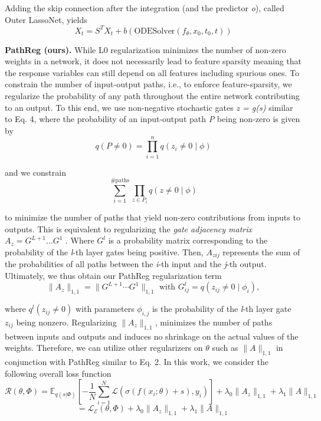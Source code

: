 \documentclass{article}
\begin{document}
    Adding the skip connection after the integration (and the predictor \textit{o}), called Outer LassoNet, yields
    \[
    X_t = S^T X_t + b(\text{ODESolver}(f_{\theta}, x_0, t_0, t)) \tag{8}
    \]

   \textbf{ PathReg (ours).} While L0 regularization minimizes the number of non-zero weights in a network, it
    does not necessarily lead to feature sparsity meaning that the response variables can still depend on
    all features including spurious ones. To constrain the number of input-output paths, i.e., to enforce
    feature-sparsity, we regularize the probability of any path throughout the entire network contributing
    to an output. To this end, we use non-negative stochastic gates \textit{z = g(s)} similar to Eq. 4, where the
    probability of an input-output path \textit{P} being non-zero is given by
    \[
    q(\textit{P} \neq 0) = \prod_{i=1}^{n} q(z_i \neq 0 \mid \phi) \tag{9}
   \]

    and we constrain
    \[
\sum_{i=1}^{\#\text{paths}} \prod_{z \in P_i} q(z \neq 0 \mid \phi) \tag{10} 
\]

    to minimize the number of paths that yield non-zero contributions from inputs to outputs. This is
    equivalent to regularizing the \textit{gate adjacency matrix} $A_{z} = G^{L+1}...G^{1}$
    . Where $G^{l}$
    is a probability
    matrix corresponding to the probability of the \textit{l}-th layer gates being positive. Then, $A_{zij}$ represents
    the sum of the probabilities of all paths between the \textit{i}-th input and the \textit{j}-th output. Ultimately, we
    thus obtain our PathReg regularization term
    \[
\|A_z\|_{1,1} = \|G^{L+1} \cdots G^{1}\|_{1,1} \text{ with } G_{ij}^l = q(z_{ij} \neq 0 \mid \phi_i), \tag{11}
\]

    where $q^{l}
    (z_{ij}\neq 0)$ with parameters $\phi _{i,j}$ is the probability of the \textit{l}-th layer gate $z_{ij}$ being nonzero.
    Regularizing $\|A_z\|_{1,1}$, minimizes the number of paths between inputs and outputs and induces no
    shrinkage on the actual values of the weights. Therefore, we can utilize other regularizers on $\theta$ such
    as $\|A\|_{1,1}$ in conjunction with PathReg similar to Eq. 2. In this work, we consider the following
    overall loss function
    \[
    \mathcal{R}(\theta, \Phi) = \mathbb{E}_{q(s|\Phi)}\left[-\frac{1}{N}\sum_{i=1}^{N} \mathcal{L}(\sigma(f(x_i; \theta) + s), y_i)\right] + \lambda_0 \|A_z\|_{1,1} + \lambda_1 \|A\|_{1,1}
    \]
    \[
    = \mathcal{L}_{\mathcal{E}}(\theta, \Phi) + \lambda_0 \|A_z\|_{1,1} + \lambda_1 \|A\|_{1,1} \tag{12}
    \]
\end{document}

